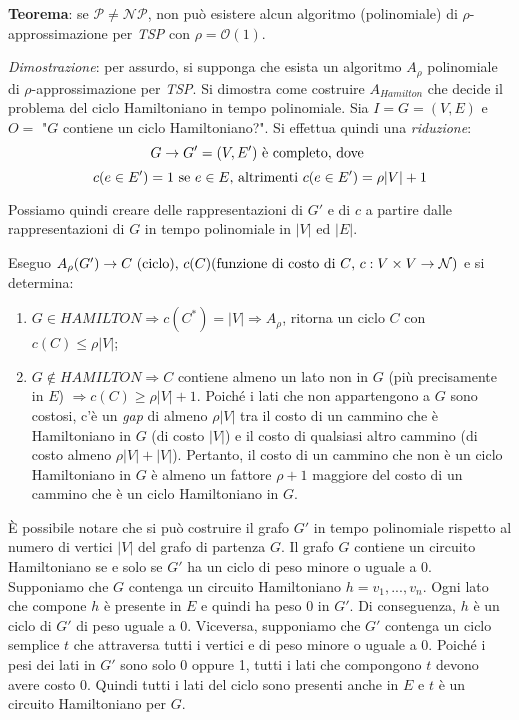 \textbf{Teorema}: se $\mathcal{P} \ne \mathcal{NP}$, non può esistere alcun algoritmo
(polinomiale) di $\rho$-approssimazione per \textit{TSP} con $\rho = \mathcal{O}(1)$.

\textit{Dimostrazione}: per assurdo, si supponga che esista un algoritmo $A_\rho$
polinomiale di $\rho$-approssimazione per \textit{TSP}. Si dimostra come costruire $A_{Hamilton}$
che decide il problema del ciclo Hamiltoniano in tempo polinomiale. Sia $I = G =(V,E)$
e $O = $ "$G$ contiene un ciclo Hamiltoniano?". Si effettua quindi una \textit{riduzione}:
\[
    G \rightarrow G' = (V, E') \textnormal{ è completo, dove }
\]
\[
    c(e \in E') = 1 \textnormal{ se } e \in E \textnormal{, altrimenti } c(e \in E') = \rho|V| + 1
\]

Possiamo quindi creare delle rappresentazioni di $G'$ e di $c$ a partire dalle rappresentazioni
di $G$ in tempo polinomiale in $|V|$ ed $|E|$.

Eseguo $A_\rho(G') \rightarrow C \textnormal{ (ciclo), } c(C) \textnormal{(funzione di costo di $C$, $c: V \times V \rightarrow \mathcal{N}$)}$ e si
determina:
\begin{enumerate}
\item $G \in HAMILTON \Rightarrow c(C^*) = |V| \Rightarrow A_\rho$, ritorna un ciclo $C$
con $c(C) \le \rho|V|$;
\item $G \not\in HAMILTON \Rightarrow C$ contiene almeno un lato non in
$G$ (più precisamente in $E$) $\Rightarrow c(C) \ge \rho|V| + 1$. Poiché i lati che non
appartengono a $G$ sono costosi, c'è un \textit{gap} di almeno $\rho |V|$ tra il costo di un cammino
che è Hamiltoniano in $G$ (di costo $|V|$) e il costo di qualsiasi altro cammino (di costo
almeno $\rho |V| + |V|$). Pertanto, il costo di un cammino che non è un ciclo Hamiltoniano
in $G$ è almeno un fattore $\rho + 1$ maggiore del costo di un cammino che è un ciclo
Hamiltoniano in $G$.
\end{enumerate}

È possibile notare che si può costruire il grafo $G'$ in tempo polinomiale rispetto al numero
di vertici $|V|$ del grafo di partenza $G$. Il grafo $G$ contiene un circuito Hamiltoniano se e
solo se $G'$ ha un ciclo di peso minore o uguale a 0. Supponiamo che $G$ contenga un circuito
Hamiltoniano $h = v_1, ..., v_n$. Ogni lato che compone $h$ è presente in $E$ e quindi ha peso 0 in $G'$.
Di conseguenza, $h$ è un ciclo di $G'$ di peso uguale a 0. Viceversa, supponiamo che $G'$ contenga un ciclo
semplice $t$ che attraversa tutti i vertici e di peso minore o uguale a 0. Poiché i pesi dei lati
in $G'$ sono solo 0 oppure 1, tutti i lati che compongono $t$ devono avere costo 0. Quindi tutti i
lati del ciclo sono presenti anche in $E$ e $t$ è un circuito Hamiltoniano per $G$.


